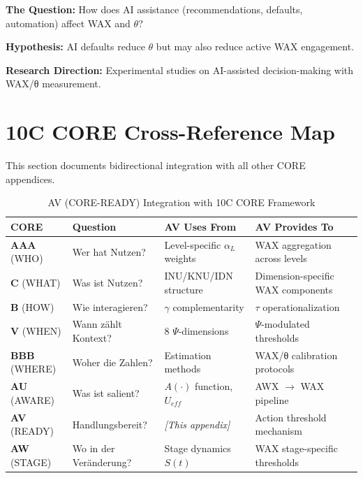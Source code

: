 \textbf{The Question:} How does AI assistance (recommendations, defaults, automation) affect WAX and $\theta$?

\textbf{Hypothesis:} AI defaults reduce $\theta$ but may also reduce active WAX engagement.

\textbf{Research Direction:} Experimental studies on AI-assisted decision-making with WAX/θ measurement.


\section{10C CORE Cross-Reference Map}
\label{sec:av-cross-reference-map}

This section documents bidirectional integration with all other CORE appendices.

\begin{table}[htbp]
\centering
\caption{AV (CORE-READY) Integration with 10C CORE Framework}
\label{tab:av-9c-integration}
\renewcommand{\arraystretch}{1.4}
\begin{tabular}{@{}p{2cm}p{3cm}p{4cm}p{4cm}@{}}
\toprule
\textbf{CORE} & \textbf{Question} & \textbf{AV Uses From} & \textbf{AV Provides To} \\
\midrule
\textbf{AAA} (WHO) & Wer hat Nutzen? & Level-specific $\alpha_L$ weights & WAX aggregation across levels \\
\textbf{C} (WHAT) & Was ist Nutzen? & INU/KNU/IDN structure & Dimension-specific WAX components \\
\textbf{B} (HOW) & Wie interagieren? & $\gamma$ complementarity & $\tau$ operationalization \\
\textbf{V} (WHEN) & Wann zählt Kontext? & 8 $\Psi$-dimensions & $\Psi$-modulated thresholds \\
\textbf{BBB} (WHERE) & Woher die Zahlen? & Estimation methods & WAX/θ calibration protocols \\
\textbf{AU} (AWARE) & Was ist salient? & $A(\cdot)$ function, $U_{eff}$ & AWX $\to$ WAX pipeline \\
\textbf{AV} (READY) & Handlungsbereit? & \textit{[This appendix]} & Action threshold mechanism \\
\textbf{AW} (STAGE) & Wo in der Veränderung? & Stage dynamics $S(t)$ & WAX stage-specific thresholds \\
\bottomrule
\end{tabular}
\end{table}

